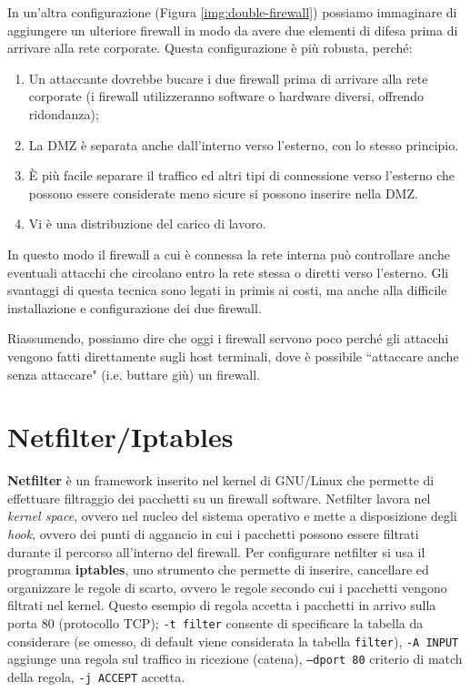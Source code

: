 In un'altra configurazione (Figura \ref{img:double-firewall}) possiamo immaginare di aggiungere un ulteriore firewall in modo da avere due elementi di difesa prima di arrivare alla rete corporate. Questa configurazione è più robusta, perché:
\begin{enumerate}
	\item Un attaccante dovrebbe bucare i due firewall prima di arrivare alla rete corporate (i firewall utilizzeranno software o hardware diversi, offrendo ridondanza);
	\item La DMZ è separata anche dall'interno verso l’esterno, con lo stesso principio.
	\item È più facile separare il traffico ed altri tipi di connessione verso l'esterno che possono essere considerate meno sicure si possono inserire nella DMZ.
	\item Vi è una distribuzione del carico di lavoro.
\end{enumerate}
In questo modo il firewall a cui è connessa la rete interna può controllare anche eventuali attacchi che circolano entro la rete stessa o diretti verso l'esterno. Gli svantaggi di questa tecnica sono legati in primis ai costi, ma anche alla difficile installazione e configurazione dei due firewall.

Riassumendo, possiamo dire che oggi i firewall servono poco perché gli attacchi vengono fatti direttamente sugli host terminali, dove è possibile \textquotedblleft attaccare anche senza attaccare" (i.e. buttare giù) un firewall.

\section{Netfilter/Iptables}
\textbf{Netfilter} è un framework inserito nel kernel di GNU/Linux che permette di effettuare filtraggio dei pacchetti su un firewall software. Netfilter lavora nel \textit{kernel space}, ovvero nel nucleo del sistema operativo e mette a disposizione degli \textit{hook}, ovvero dei punti di aggancio in cui i pacchetti possono essere filtrati durante il percorso all'interno del firewall. Per configurare netfilter si usa il programma \textbf{iptables}, uno strumento che permette di inserire, cancellare ed organizzare le regole di scarto, ovvero le regole secondo cui i pacchetti vengono filtrati nel kernel. Questo esempio di regola
accetta i pacchetti in arrivo sulla porta 80 (protocollo TCP); \texttt{-t filter} consente di specificare la tabella da considerare (se omesso, di default viene considerata la tabella \texttt{filter}), \texttt{-A INPUT} aggiunge una regola sul traffico in ricezione (catena), \texttt{--dport 80} criterio di match della regola, \texttt{-j ACCEPT} accetta.

